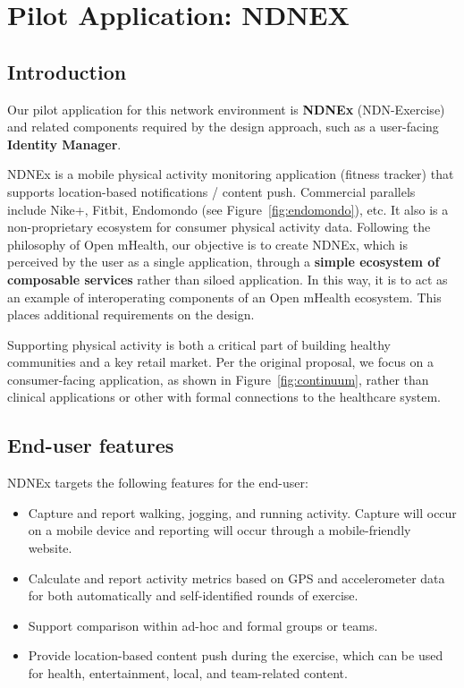 \section{Pilot Application: NDNEX}

\subsection{Introduction}

Our pilot application for this network environment is \textbf{NDNEx} (NDN-Exercise) and related components required by the design approach, such as a user-facing \textbf{Identity Manager}.  

NDNEx is a mobile physical activity monitoring application (fitness tracker) that supports location-based notifications / content push. Commercial parallels include  Nike+, Fitbit, Endomondo (see Figure~\ref{fig:endomondo}), etc. It also is a non-proprietary ecosystem for consumer physical activity data. Following the philosophy of Open mHealth, our objective is to create NDNEx, which is perceived by the user as a single application, through  a \textbf{simple ecosystem of composable services} rather than siloed application. In this way, it is to act as an example of interoperating components of an Open mHealth ecosystem.  This places additional requirements on the design. 

Supporting physical activity is both a critical part of building healthy communities and a key retail market. Per the original proposal, we focus on a consumer-facing application, as shown in Figure~\ref{fig:continuum}, rather than clinical applications or other with formal connections to the healthcare system. 

\subsection{End-user features} 
NDNEx targets  the following features for the end-user:
\begin{itemize}
\item Capture and report walking, jogging, and running activity.  Capture will occur on a mobile device and reporting will occur through a mobile-friendly website. 
\item Calculate and report activity metrics based on GPS and accelerometer data for both automatically and self-identified rounds of exercise.  
\item Support comparison within ad-hoc and formal groups or teams. 
\item Provide location-based content push during the exercise, which can be used for health, entertainment, local, and team-related content. 
\end{itemize}

